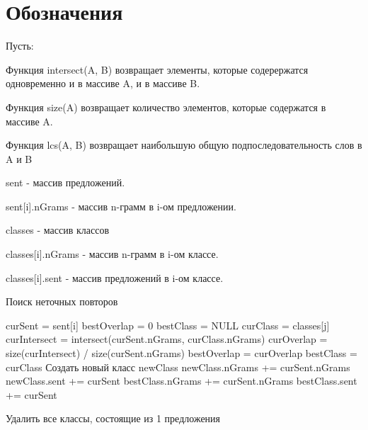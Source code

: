 \documentclass[a4paper,11pt]{article}
\def\Hello{Алгоритм}
\def\Hello{Welcome! Привет!}
\begin{document}
\setlength{\parindent}{0cm}{\Huge \Hello} 
\bigskip
\section*{Обозначения}

Пусть:

Функция intersect(A, B) возвращает элементы, которые содерержатся одновременно и в массиве A, и в массиве B. 

Функция size(A) возвращает количество элементов, которые содержатся в массиве A.

Функция lcs(A, B) возвращает наибольшую общую подпоследовательность слов в A и B

sent - массив предложений.

sent[i].nGrams - массив n-грамм в i-ом предложении.

classes - массив классов

classes[i].nGrams - массив n-грамм в i-ом классе.

classes[i].sent - массив предложений в i-ом классе.


\begin{algorithm}
\caption{Поиск неточных повторов}\label{alg:Example}
\begin{algorithmic}[1]
 
    \State curSent = sent[i]
    \State bestOverlap = 0
    \State bestClass = NULL
        \State curClass = classes[j]
        \State curIntersect = intersect(curSent.nGrams, curClass.nGrams)
        \State curOverlap = size(curIntersect) / size(curSent.nGrams)
            \State bestOverlap = curOverlap
            \State bestClass = curClass
        \EndIf
    \EndFor
        \State Создать новый класс newClass
        \State newClass.nGrams += curSent.nGrams
        \State newClass.sent += curSent
    \Else
        \State bestClass.nGrams += curSent.nGrams
        \State bestClass.sent += curSent
    \EndIf
\EndFor 
 
\State Удалить все классы, состоящие из 1 предложения
 
\end{algorithmic}
\end{algorithm}
\end{document}

